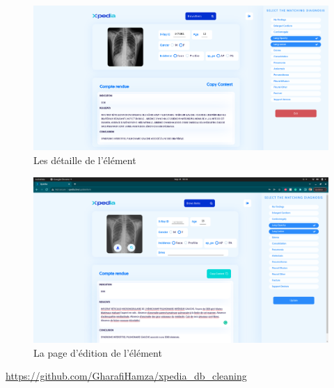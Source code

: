 \documentclass[12pt]{report}
\begin{document}
    \begin{figure}[H]
        \centering
        \includegraphics[width=1\textwidth]{xpedia_view_page.png}
        \caption{Les détaille de l’élément}\label{fig:xpedia_view_page}
    \end{figure}
    
    \begin{figure}[H]
        \centering
        \includegraphics[width=\textwidth]{xpedia_edit_page.png}
        \caption{La page d’édition de l’élément}\label{fig:xpedia_item_thumbnail}
    \end{figure}

    \url{https://github.com/GharafiHamza/xpedia_db_cleaning}\label{repo}
    
\end{document}
